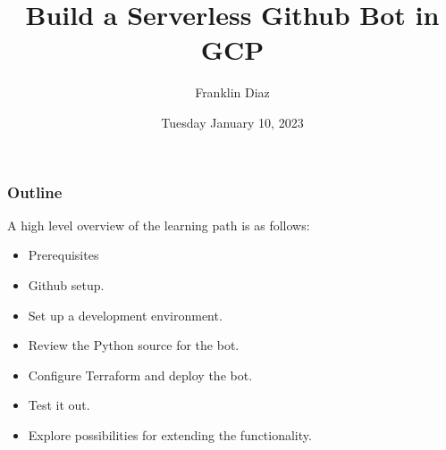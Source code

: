 \documentclass[aspectratio=169]{beamer}
\title{Build a Serverless Github Bot in GCP}
\subtitle{}
\author{Franklin Diaz}
\institute{DE:AD:10:C5}
\date{Tuesday January 10, 2023}
\begin{document}
\frame{\titlepage}




\begin{frame}
    \frametitle{Outline}

    A high level overview of the learning path is as follows:

    \begin{raggedright}
        \begin{itemize}
            \item Prerequisites
            \item Github setup.
            \item Set up a development environment.
            \item Review the Python source for the bot.
            \item Configure Terraform and deploy the bot.
            \item Test it out.
            \item Explore possibilities for extending the functionality.
        \end{itemize}
    \end{raggedright}
    \vspace{2mm}
\end{frame}
\end{document}
